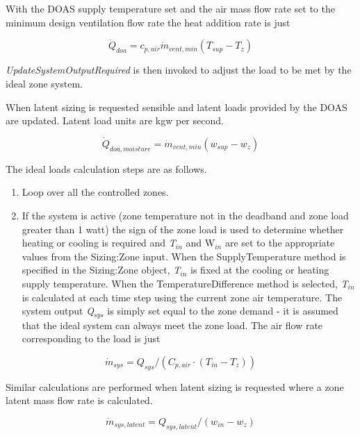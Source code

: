 With the DOAS supply temperature set and the air mass flow rate set to the minimum design ventilation flow rate the heat addition rate is just

\begin{equation}
{\dot Q_{doa}} = {c_{p,air}}{\dot m_{vent,min}}({T_{sup}} - {T_z})
\end{equation}

\emph{UpdateSystemOutputRequired} is then invoked to adjust the load to be met by the ideal zone system.

When latent sizing is requested sensible and latent loads provided by the DOAS are updated. Latent load units are kgw per second.

\begin{equation}
{\dot Q_{doa, moisture}} = {\dot m_{vent,min}}({w_{sup}} - {w_z})
\end{equation}

The ideal loads calculation steps are as follows.

\begin{enumerate}
\def\labelenumi{\arabic{enumi})}
\item
  Loop over all the controlled zones.
\item
  If the system is active (zone temperature not in the deadband and zone load greater than 1 watt) the sign of the zone load is used to determine whether heating or cooling is required and \emph{T\(_{in}\)} and W\emph{\(_{in}\)} are set to the appropriate values from the Sizing:Zone input. When the SupplyTemperature method is specified in the Sizing:Zone object, \emph{T\(_{in}\)} is fixed at the cooling or heating supply temperature. When the TemperatureDifference method is selected, \emph{T\(_{in}\)} is calculated at each time step using the current zone air temperature. The system output \emph{Q\(_{sys}\)} is simply set equal to the zone demand - it is assumed that the ideal system can always meet the zone load. The air flow rate corresponding to the load is just
\end{enumerate}

\begin{equation}
{\dot m_{sys}} = {Q_{sys}}/({C_{p,air}} \cdot ({T_{in}} - {T_z}))
\end{equation}

Similar calculations are performed when latent sizing is requested where a zone latent mass flow rate is calculated.

\begin{equation}
{\dot m_{sys, latent}} = {Q_{sys, latent}}/({w_{in}} - {w_z})
\end{equation}


